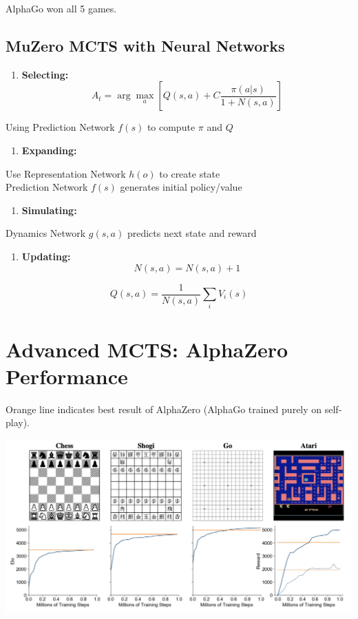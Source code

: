 \documentclass[
  letterpaper,
  DIV=11,
  numbers=noendperiod]{scrreprt}
\providecommand{\tightlist}{%
  \setlength{\itemsep}{0pt}\setlength{\parskip}{0pt}}\usepackage{longtable,booktabs,array}
\begin{document}
AlphaGo won all 5 games.

\subsection{MuZero MCTS with Neural
Networks}\label{muzero-mcts-with-neural-networks}

\begin{enumerate}
\def\labelenumi{\arabic{enumi}.}
\tightlist
\item
  \textbf{Selecting:}\\
  \[ 
  A_t = \arg\max_a \left[ Q(s,a) + C \frac{\pi(a|s)}{1 + N(s,a)}  \right] 
  \]
\end{enumerate}

Using Prediction Network \(f(s)\) to compute \(\pi\) and \(Q\)

\begin{enumerate}
\def\labelenumi{\arabic{enumi}.}
\setcounter{enumi}{1}
\tightlist
\item
  \textbf{Expanding:}
\end{enumerate}

Use Representation Network \(h(o)\) to create state\\
Prediction Network \(f(s)\) generates initial policy/value

\begin{enumerate}
\def\labelenumi{\arabic{enumi}.}
\setcounter{enumi}{2}
\tightlist
\item
  \textbf{Simulating:}
\end{enumerate}

Dynamics Network \(g(s,a)\) predicts next state and reward

\begin{enumerate}
\def\labelenumi{\arabic{enumi}.}
\setcounter{enumi}{3}
\tightlist
\item
  \textbf{Updating:}\\
  \[ 
  N(s,a) = N(s,a) + 1 
  \]
\end{enumerate}

\[ 
Q(s,a) = \frac{1}{N(s,a)} \sum_i V_i(s) 
\]

\section{Advanced MCTS: AlphaZero
Performance}\label{advanced-mcts-alphazero-performance}

Orange line indicates best result of AlphaZero (AlphaGo trained purely
on self-play).

\includegraphics[width=0.8\linewidth,height=\textheight,keepaspectratio]{lecture11/images/MuzeroResults.png}
\end{document}
